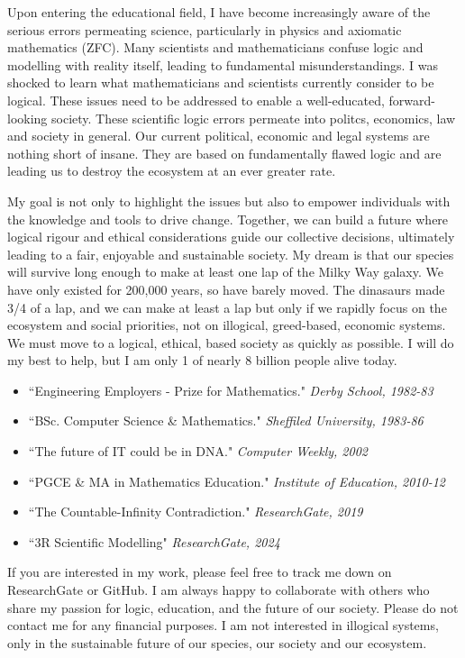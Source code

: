 \documentclass[12pt]{article}
\begin{document}
Upon entering the educational field, I have become increasingly aware of the serious errors permeating science, particularly in physics and axiomatic mathematics (ZFC). Many scientists and mathematicians confuse logic and modelling with reality itself, leading to fundamental misunderstandings. I was shocked to learn what mathematicians and scientists currently consider to be logical. These issues need to be addressed to enable a well-educated, forward-looking society. These scientific logic errors permeate into politcs, economics, law and society in general. Our current political, economic and legal systems are nothing short of insane. They are based on fundamentally flawed logic and are leading us to destroy the ecosystem at an ever greater rate.

My goal is not only to highlight the issues but also to empower individuals with the knowledge and tools to drive change. Together, we can build a future where logical rigour and ethical considerations guide our collective decisions, ultimately leading to a fair, enjoyable and sustainable society. My dream is that our species will survive long enough to make at least one lap of the Milky Way galaxy. We have only existed for 200,000 years, so have barely moved. The dinasaurs made 3/4 of a lap, and we can make at least a lap but only if we rapidly focus on the ecosystem and social priorities, not on illogical, greed-based, economic systems. We must move to a logical, ethical, \iR{} based society as quickly as possible. I will do my best to help, but I am only 1 of nearly 8 billion people alive today.
\begin{itemize}
    \item ``Engineering Employers - Prize for Mathematics." \textit{Derby School, 1982-83}
    \item ``BSc. Computer Science \& Mathematics." \textit{Sheffiled University, 1983-86}
    \item ``The future of IT could be in DNA." \textit{Computer Weekly, 2002}
    \item ``PGCE \& MA in Mathematics Education." \textit{Institute of Education, 2010-12}
    \item ``The Countable-Infinity Contradiction." \textit{ResearchGate, 2019}
    \item ``3R Scientific Modelling" \textit{ResearchGate, 2024}
\end{itemize}

If you are interested in my work, please feel free to track me down on ResearchGate or GitHub. I am always happy to collaborate with others who share my passion for logic, education, and the future of our society. Please do not contact me for any financial purposes. I am not interested in illogical systems, only in the sustainable future of our species, our society and our ecosystem.
\end{document}
